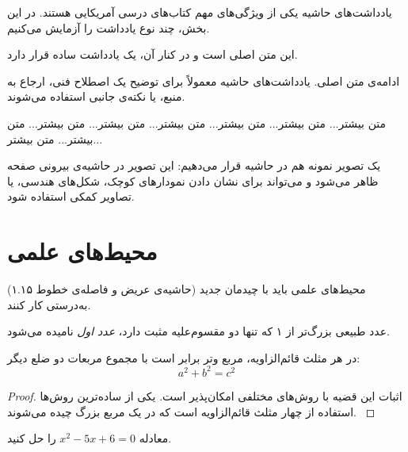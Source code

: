 \documentclass{matinbook}
\begin{document}
یادداشت‌های حاشیه یکی از ویژگی‌های مهم کتاب‌های درسی
آمریکایی هستند. در این بخش، چند نوع یادداشت را آزمایش
می‌کنیم.

این متن اصلی است و در کنار آن، یک یادداشت ساده قرار دارد.

ادامه‌ی متن اصلی. یادداشت‌های حاشیه معمولاً برای توضیح
یک اصطلاح فنی، ارجاع به منبع، یا نکته‌ی جانبی استفاده
می‌شوند.

متن بیشتر... متن بیشتر... متن بیشتر... متن بیشتر...
متن بیشتر... متن بیشتر... متن بیشتر... متن بیشتر...

یک تصویر نمونه هم در حاشیه قرار می‌دهیم:
این تصویر در حاشیه‌ی بیرونی صفحه ظاهر می‌شود و می‌تواند
برای نشان دادن نمودارهای کوچک، شکل‌های هندسی، یا
تصاویر کمکی استفاده شود.

\section{محیط‌های علمی}
\label{sec:environments}

محیط‌های علمی باید با چیدمان جدید (حاشیه‌ی عریض و فاصله‌ی
خطوط ۱.۱۵) به‌درستی کار کنند.

\begin{definition}
    عدد طبیعی بزرگ‌تر از ۱ که تنها دو مقسوم‌علیه مثبت دارد،
    \emph{عدد اول} نامیده می‌شود.
    \label{def:layout-prime}
\end{definition}

\begin{theorem}
    در هر مثلث قائم‌الزاویه، مربع وتر برابر است با مجموع
    مربعات دو ضلع دیگر:
    \[
    a^2 + b^2 = c^2
    \]
    \label{thm:layout-pythagoras}
\end{theorem}


\begin{proof}
    اثبات این قضیه با روش‌های مختلفی امکان‌پذیر است.
    یکی از ساده‌ترین روش‌ها استفاده از چهار مثلث قائم‌الزاویه
    است که در یک مربع بزرگ چیده می‌شوند.
    \label{prf:layout-pythagoras}
\end{proof}

\begin{example}
    معادله $x^2 - 5x + 6 = 0$ را حل کنید.
    \label{ex:layout-quadratic}
\end{example}
\end{document}
